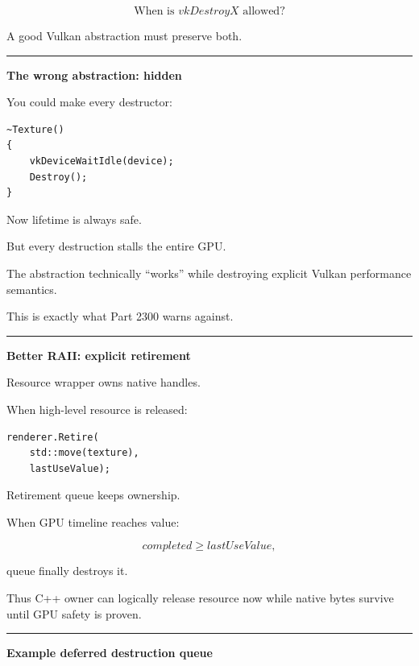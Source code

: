 \[
\boxed{
\text{When is }vkDestroyX\text{ allowed?}
}
\]

A good Vulkan abstraction must preserve both.

\begin{center}\rule{0.5\linewidth}{0.5pt}\end{center}

\textbf{The wrong abstraction: hidden }

You could make every destructor:

\begin{verbatim}
~Texture()
{
    vkDeviceWaitIdle(device);
    Destroy();
}
\end{verbatim}

Now lifetime is always safe.

But every destruction stalls the entire GPU.

The abstraction technically ``works'' while destroying explicit Vulkan performance semantics.

This is exactly what Part 2300 warns against.

\begin{center}\rule{0.5\linewidth}{0.5pt}\end{center}

\textbf{Better RAII: explicit retirement}

Resource wrapper owns native handles.

When high-level resource is released:

\begin{verbatim}
renderer.Retire(
    std::move(texture),
    lastUseValue);
\end{verbatim}

Retirement queue keeps ownership.

When GPU timeline reaches value:

\[
completed\ge lastUseValue,
\]

queue finally destroys it.

Thus C++ owner can logically release resource now while native bytes survive until GPU safety is proven.

\begin{center}\rule{0.5\linewidth}{0.5pt}\end{center}

\textbf{Example deferred destruction queue}

